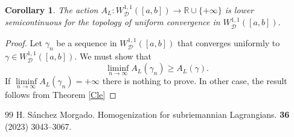 \documentclass[10pt,a4paper]{amsart}
\newtheorem{corollary}{Corollary}
\newcommand{\R}{\mathbb R}
\newcommand{\cD}{\mathcal D}
\newcommand{\cW}{W^{1,1}}
\newcommand{\cWD}{\cW_\cD}
\newcommand{\ga}{\gamma}
\begin{document}
\begin{corollary}\label{low-semi}
  The action
  $A_L:\cWD([a,b])\to \R\cup\{+\infty\}$ is lower semicontinuous
  for the topology of uniform convergence in $\cWD([a,b])$.
\end{corollary}
\begin{proof}
  Let $\ga_n$ be a sequence in $\cWD([a,b])$ that converges
  uniformly to $\ga\in \cWD([a,b])$. We must show that
  \[\liminf_{n\to\infty}A_L(\ga_n)\ge A_L(\ga).\]
If $\liminf\limits_{n\to\infty}A_L(\ga_n)=+\infty$ there is nothing to prove.
In other case, the result follows from Theorem \ref{Cle}
\end{proof}

\begin{thebibliography}{99}
 \newblock H. S\'anchez Morgado. \newblock Homogenization for subriemannian Lagrangians.  {\bf 36} (2023) 3043--3067.
\end{thebibliography}
\end{document}
